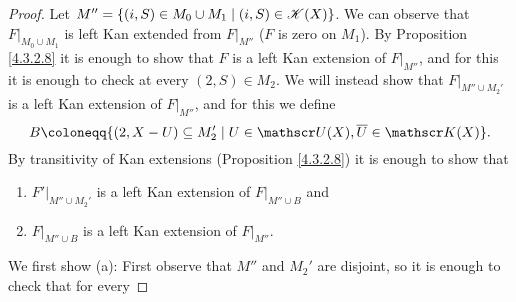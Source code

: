 \documentclass[../../thesis.tex]{subfiles}
\begin{document}
\begin{proof}
    Let $M''=\{(i,S) \in M_0 \cup M_1 \mid (i,S)\in \mathscr{K}(X)\}$.
    We can observe that $F|_{M_0 \cup M_1}$ is left Kan extended from $F|_{M''}$ ($F$ is zero on $M_1$).
    By Proposition \ref{4.3.2.8} it is enough to show that $F$ is a left Kan extension of $F|_{M''}$, and for this it is enough to check at every $(2,S) \in M_2$.
    We will instead show that $F|_{M'' \cup M_2'}$ is a left Kan extension of $F|_{M''}$, and for this we define
    \[B\coloneqq \{(2, X- U) \subseteq M_2' \mid U \in \Open(X) , \overline{U} \in \K(X)\} .\]
    By transitivity of Kan extensions (Proposition \ref{4.3.2.8}) it is enough to show that
    \begin{enumerate}[label=(\alph*)]
        \item $F'|_{M'' \cup M_2'}$ is a left Kan extension of $F|_{M'' \cup B}$ and
        \item $F|_{M'' \cup B}$ is a left Kan extension of $F|_{M''}$.
    \end{enumerate}
    We first show (a):
    First observe that $M''$ and $M_2'$ are disjoint, so it is enough to check that for every


\end{proof}
\end{document}
